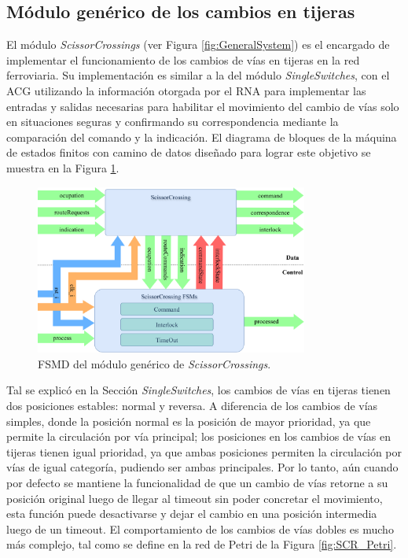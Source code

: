 \subsection{Módulo genérico de los cambios en tijeras}
	\label{sec:ACG_scr}
		
	El módulo \textit{ScissorCrossings} (ver Figura \ref{fig:GeneralSystem}) es el encargado de implementar el funcionamiento de los cambios de vías en tijeras en la red ferroviaria. Su implementación es similar a la del módulo \textit{SingleSwitches}, con el ACG utilizando la información otorgada por el RNA para implementar las entradas y salidas necesarias para habilitar el movimiento del cambio de vías solo en situaciones seguras y confirmando su correspondencia mediante la comparación del comando y la indicación. El diagrama de bloques de la máquina de estados finitos con camino de datos diseñado para lograr este objetivo se muestra en la Figura \ref{fig:SCR_module}.
	
	\begin{figure}[H]
		\centering
		\includegraphics[width=0.8\textwidth]{Figuras/SCR_module}
		\centering\caption{FSMD del módulo genérico de \textit{ScissorCrossings}.}
		\label{fig:SCR_module}
	\end{figure}
	
	Tal se explicó en la Sección \textit{SingleSwitches}, los cambios de vías en tijeras tienen dos posiciones estables: normal y reversa. A diferencia de los cambios de vías simples, donde la posición normal es la posición de mayor prioridad, ya que permite la circulación por vía principal; los posiciones en los cambios de vías en tijeras tienen igual prioridad, ya que ambas posiciones permiten la circulación por vías de igual categoría, pudiendo ser ambas principales. Por lo tanto, aún cuando por defecto se mantiene la funcionalidad de que un cambio de vías retorne a su posición original luego de llegar al timeout sin poder concretar el movimiento, esta función puede desactivarse y dejar el cambio en una posición intermedia luego de un timeout. El comportamiento de los cambios de vías dobles es mucho más complejo, tal como se define en la red de Petri de la Figura \ref{fig:SCR_Petri}.
	
